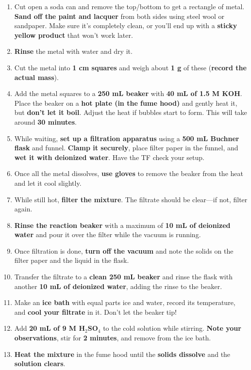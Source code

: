 \documentclass{report}
\begin{document}
\begin{enumerate}
    \item Cut open a soda can and remove the top/bottom to get a rectangle of metal. \textbf{Sand off the paint and lacquer} from both sides using steel wool or sandpaper. Make sure it’s completely clean, or you’ll end up with a \textbf{sticky yellow product} that won’t work later.
    \item \textbf{Rinse} the metal with water and dry it.
    \item Cut the metal into \textbf{1 cm squares} and weigh about \textbf{1 g} of these (\textbf{record the actual mass}).
    \item Add the metal squares to a \textbf{250 mL beaker} with \textbf{40 mL of 1.5 M KOH}. Place the beaker on a \textbf{hot plate (in the fume hood)} and gently heat it, but \textbf{don’t let it boil}. Adjust the heat if bubbles start to form. This will take around \textbf{30 minutes}.
    \item While waiting, \textbf{set up a filtration apparatus} using a \textbf{500 mL Buchner flask} and funnel. \textbf{Clamp it securely}, place filter paper in the funnel, and \textbf{wet it with deionized water}. Have the TF check your setup.
    \item Once all the metal dissolves, \textbf{use gloves} to remove the beaker from the heat and let it cool slightly.
    \item While still hot, \textbf{filter the mixture}. The filtrate should be clear—if not, filter again.
    \item \textbf{Rinse the reaction beaker} with a maximum of \textbf{10 mL of deionized water} and pour it over the filter while the vacuum is running.
    \item Once filtration is done, \textbf{turn off the vacuum} and note the solids on the filter paper and the liquid in the flask.
    \item Transfer the filtrate to a \textbf{clean 250 mL beaker} and rinse the flask with another \textbf{10 mL of deionized water}, adding the rinse to the beaker.
    \item Make an \textbf{ice bath} with equal parts ice and water, record its temperature, and \textbf{cool your filtrate} in it. Don’t let the beaker tip!
    \item Add \textbf{20 mL of 9 M H$_2$SO$_4$} to the cold solution while stirring. \textbf{Note your observations}, stir for \textbf{2 minutes}, and remove from the ice bath.
    \item \textbf{Heat the mixture} in the fume hood until the \textbf{solids dissolve} and the \textbf{solution clears}.

\end{enumerate}
\end{document}
